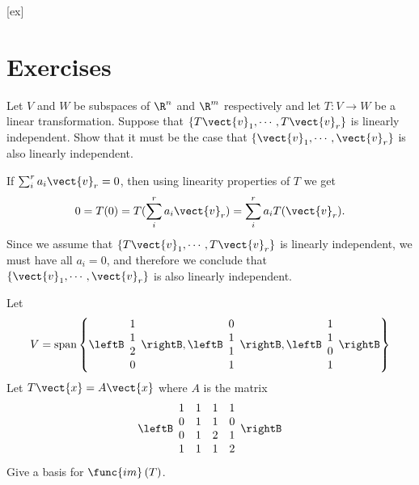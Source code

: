 [ex]
\section*{Exercises}

\begin{enumialphparenastyle}

\begin{ex} Let $V$ and $W$ be subspaces of $\R^{n}$ and $\R^{m}$
respectively and let $T:V\rightarrow W$ be a linear transformation. Suppose
that $\left\{ T\vect{v}_{1},\cdots ,T\vect{v}_{r}\right\} $ is linearly
independent. Show that it must be the case that $\left\{ \vect{v}_{1},\cdots ,
\vect{v}_{r}\right\} $ is also linearly independent.
\begin{sol}
If $\sum_i^r a_i \vect{v}_r =0$, then using linearity properties of $T$ we get 
\[ 0 = T(0) =  T(\sum_i^r a_i \vect{v}_r) = 
\sum_i^r a_i T(\vect{v}_r).\]
Since we assume that  $\left\{ T\vect{v}_{1},\cdots ,T\vect{v}_{r}\right\} $ is linearly
independent, we must have all $a_i=0$, and therefore we conclude that 
 $\left\{ \vect{v}_{1},\cdots ,
\vect{v}_{r}\right\} $ is also linearly independent.
\end{sol}
\end{ex}


\begin{ex} Let 
\begin{equation*}
V=\mbox{span}\left\{ \leftB 
\begin{array}{c}
1 \\ 
1 \\ 
2 \\ 
0
\end{array}
\rightB ,\leftB 
\begin{array}{c}
0 \\ 
1 \\ 
1 \\ 
1
\end{array}
\rightB ,\leftB 
\begin{array}{c}
1 \\ 
1 \\ 
0 \\ 
1
\end{array}
\rightB \right\}
\end{equation*}
Let $T\vect{x}=A\vect{x}$ where $A$ is the matrix 
\begin{equation*}
\leftB 
\begin{array}{cccc}
1 & 1 & 1 & 1 \\ 
0 & 1 & 1 & 0 \\ 
0 & 1 & 2 & 1 \\ 
1 & 1 & 1 & 2
\end{array}
\rightB
\end{equation*}
Give a basis for $\func{im}\left( T\right) $.
\end{ex}



\end{enumialphparenastyle}
